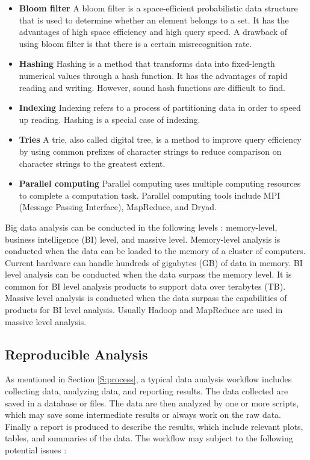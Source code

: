 \documentclass[]{book}
\theoremstyle{definition}
\theoremstyle{definition}
\theoremstyle{definition}
\theoremstyle{remark}
\begin{document}
\begin{itemize}
\item
  \textbf{Bloom filter} A bloom filter is a space-efficient
  probabilistic data structure that is used to determine whether an
  element belongs to a set. It has the advantages of high space
  efficiency and high query speed. A drawback of using bloom filter is
  that there is a certain misrecognition rate.
\item
  \textbf{Hashing} Hashing is a method that transforms data into
  fixed-length numerical values through a hash function. It has the
  advantages of rapid reading and writing. However, sound hash functions
  are difficult to find.
\item
  \textbf{Indexing} Indexing refers to a process of partitioning data in
  order to speed up reading. Hashing is a special case of indexing.
\item
  \textbf{Tries} A trie, also called digital tree, is a method to
  improve query efficiency by using common prefixes of character strings
  to reduce comparison on character strings to the greatest extent.
\item
  \textbf{Parallel computing} Parallel computing uses multiple computing
  resources to complete a computation task. Parallel computing tools
  include MPI (Message Passing Interface), MapReduce, and Dryad.
\end{itemize}

Big data analysis can be conducted in the following levels
\citep{chen2014b}: memory-level, business intelligence (BI) level, and
massive level. Memory-level analysis is conducted when the data can be
loaded to the memory of a cluster of computers. Current hardware can
handle hundreds of gigabytes (GB) of data in memory. BI level analysis
can be conducted when the data surpass the memory level. It is common
for BI level analysis products to support data over terabytes (TB).
Massive level analysis is conducted when the data surpass the
capabilities of products for BI level analysis. Usually Hadoop and
MapReduce are used in massive level analysis.

\subsection{Reproducible Analysis}\label{reproducible-analysis}

As mentioned in Section \ref{S:process}, a typical data analysis
workflow includes collecting data, analyzing data, and reporting
results. The data collected are saved in a database or files. The data
are then analyzed by one or more scripts, which may save some
intermediate results or always work on the raw data. Finally a report is
produced to describe the results, which include relevant plots, tables,
and summaries of the data. The workflow may subject to the following
potential issues \citep[Chapter 2]{mailund2017}:
\end{document}
